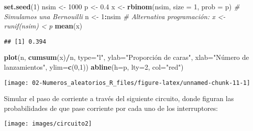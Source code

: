 \documentclass[
]{book}
\newenvironment{Shaded}{\begin{snugshade}}{\end{snugshade}}
\newcommand{\CommentTok}[1]{\textcolor[rgb]{0.56,0.35,0.01}{\textit{#1}}}
\newcommand{\DataTypeTok}[1]{\textcolor[rgb]{0.13,0.29,0.53}{#1}}
\newcommand{\DecValTok}[1]{\textcolor[rgb]{0.00,0.00,0.81}{#1}}
\newcommand{\FloatTok}[1]{\textcolor[rgb]{0.00,0.00,0.81}{#1}}
\newcommand{\KeywordTok}[1]{\textcolor[rgb]{0.13,0.29,0.53}{\textbf{#1}}}
\newcommand{\NormalTok}[1]{#1}
\newcommand{\OperatorTok}[1]{\textcolor[rgb]{0.81,0.36,0.00}{\textbf{#1}}}
\newcommand{\StringTok}[1]{\textcolor[rgb]{0.31,0.60,0.02}{#1}}
\theoremstyle{break}
\theoremstyle{definition}
\theoremstyle{definition}
\theoremstyle{definition}
\theoremstyle{remark}
\let\BeginKnitrBlock\begin \let\EndKnitrBlock\end
\begin{document}
\begin{enumerate}
\begin{Shaded}
\begin{Highlighting}[]
\KeywordTok{set.seed}\NormalTok{(}\DecValTok{1}\NormalTok{)}
\NormalTok{nsim <-}\StringTok{ }\DecValTok{1000}
\NormalTok{p <-}\StringTok{ }\FloatTok{0.4}
\NormalTok{x <-}\StringTok{ }\KeywordTok{rbinom}\NormalTok{(nsim, }\DataTypeTok{size =} \DecValTok{1}\NormalTok{, }\DataTypeTok{prob =}\NormalTok{ p) }\CommentTok{# Simulamos una Bernouilli}
\NormalTok{n <-}\StringTok{ }\DecValTok{1}\OperatorTok{:}\NormalTok{nsim}
\CommentTok{# Alternativa programación: x <- runif(nsim) < p}
\KeywordTok{mean}\NormalTok{(x)}
\end{Highlighting}
\end{Shaded}

\begin{verbatim}
## [1] 0.394
\end{verbatim}

\begin{Shaded}
\begin{Highlighting}[]
\KeywordTok{plot}\NormalTok{(n, }\KeywordTok{cumsum}\NormalTok{(x)}\OperatorTok{/}\NormalTok{n, }\DataTypeTok{type=}\StringTok{"l"}\NormalTok{, }\DataTypeTok{ylab=}\StringTok{"Proporción de caras"}\NormalTok{, }
     \DataTypeTok{xlab=}\StringTok{"Número de lanzamientos"}\NormalTok{, }\DataTypeTok{ylim=}\KeywordTok{c}\NormalTok{(}\DecValTok{0}\NormalTok{,}\DecValTok{1}\NormalTok{))}
\KeywordTok{abline}\NormalTok{(}\DataTypeTok{h=}\NormalTok{p, }\DataTypeTok{lty=}\DecValTok{2}\NormalTok{, }\DataTypeTok{col=}\StringTok{"red"}\NormalTok{)}
\end{Highlighting}
\end{Shaded}

  \begin{center}\texttt{[image: 02-Numeros\_aleatorios\_R\_files/figure-latex/unnamed-chunk-11-1]} \end{center}
\end{enumerate}

\BeginKnitrBlock{exercise}
\protect\hypertarget{exr:unnamed-chunk-12}{}{\label{exr:unnamed-chunk-12} }
\EndKnitrBlock{exercise}

Simular el paso de corriente a través del siguiente circuito, donde
figuran las probabilidades de que pase corriente por cada uno de los
interruptores:

\begin{center}\texttt{[image: images/circuito2]} \end{center}
\end{document}
